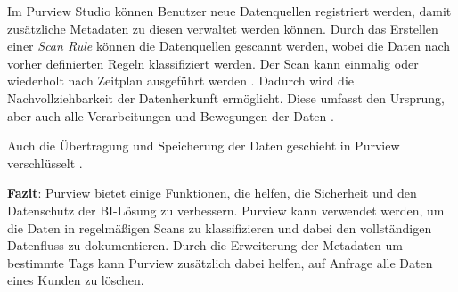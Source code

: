 Im Purview Studio können Benutzer neue Datenquellen registriert werden, damit zusätzliche Metadaten zu diesen verwaltet werden können. Durch das Erstellen einer \textit{Scan Rule} können die Datenquellen gescannt werden, wobei die Daten nach vorher definierten Regeln klassifiziert werden. Der Scan kann einmalig oder wiederholt nach Zeitplan ausgeführt werden \cite{lesteve_definitive_2021}. Dadurch wird die Nachvollziehbarkeit der Datenherkunft ermöglicht. Diese umfasst den Ursprung, aber auch alle Verarbeitungen und Bewegungen der Daten \cite{riscutia_data_2021}.

Auch die Übertragung und Speicherung der Daten geschieht in Purview verschlüsselt \cite{baldwin_azure_purview_2021}. 

\textbf{Fazit}: Purview bietet einige Funktionen, die helfen, die Sicherheit und den Datenschutz der BI-Lösung zu verbessern. Purview kann verwendet werden, um die Daten in regelmäßigen Scans zu klassifizieren und dabei den vollständigen Datenfluss zu dokumentieren. Durch die Erweiterung der Metadaten um bestimmte Tags kann Purview zusätzlich dabei helfen, auf Anfrage alle Daten eines Kunden zu löschen.